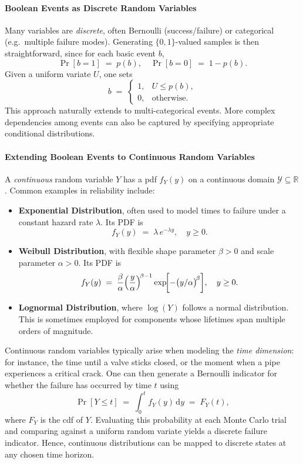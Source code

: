 \paragraph{Boolean Events as Discrete Random Variables}
Many variables are \emph{discrete}, often Bernoulli (success/failure) or categorical (e.g.\ multiple failure modes). Generating \(\{0,1\}\)-valued samples is then straightforward, since for each basic event \(b\),
\[
\Pr[b=1] \;=\; p(b),
\quad
\Pr[b=0] \;=\; 1-p(b).
\]
Given a uniform variate \(U\), one sets
\[
b
\;=\;
\begin{cases}
1, & U \le p(b),\\
0, & \text{otherwise}.
\end{cases}
\]
This approach naturally extends to multi-categorical events. More complex dependencies among events can also be captured by specifying appropriate conditional distributions.

\paragraph{Extending Boolean Events to Continuous Random Variables}
A \emph{continuous} random variable \(Y\) has a \acrfull{pdf} \(f_Y(y)\) on a continuous domain \(\mathcal{Y}\subseteq \mathbb{R}\). Common examples in reliability include:
\begin{itemize}
\item \textbf{Exponential Distribution}, often used to model times to failure under a constant hazard rate \(\lambda\). Its PDF is
\[
f_Y(y) \;=\; \lambda\, e^{-\lambda y},
\quad
y \ge 0.
\]
\item \textbf{Weibull Distribution}, with flexible shape parameter \(\beta>0\) and scale parameter \(\alpha>0\). Its PDF is
\[
f_Y(y)
\;=\;
\frac{\beta}{\alpha}
\Bigl(\frac{y}{\alpha}\Bigr)^{\!\beta -1}
\exp\!\biggl[-\bigl(y/\alpha\bigr)^{\!\beta}\biggr],
\quad
y\ge 0.
\]
\item \textbf{Lognormal Distribution}, where \(\log(Y)\) follows a normal distribution. This is sometimes employed for components whose lifetimes span multiple orders of magnitude.
\end{itemize}
Continuous random variables typically arise when modeling the \emph{time dimension}: for instance, the time until a valve sticks closed, or the moment when a pipe experiences a critical crack. One can then generate a Bernoulli indicator for whether the failure has occurred by time \(t\) using
\[
\Pr[Y \le t]
\;=\;
\int_{0}^{t} f_Y(y)\,\mathrm{d}y
\;=\;
F_Y(t),
\]
where \(F_Y\) is the \acrfull{cdf} of \(Y\). Evaluating this probability at each Monte Carlo trial and comparing against a uniform random variate yields a discrete failure indicator. Hence, continuous distributions can be mapped to discrete states at any chosen time horizon.




